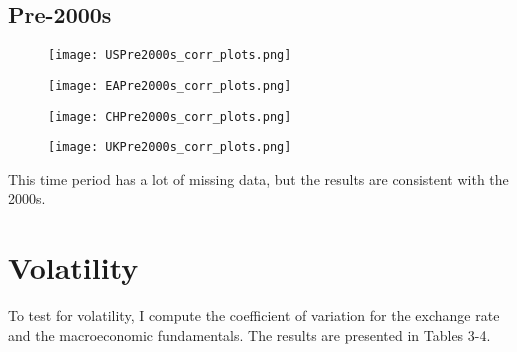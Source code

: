 \documentclass{article}
\begin{document}
\subsection{Pre-2000s}
\begin{figure}[H]
    \centering
    \texttt{[image: USPre2000s\_corr\_plots.png]}
\end{figure}
\begin{figure}[H]
    \centering
    \texttt{[image: EAPre2000s\_corr\_plots.png]}
\end{figure}
\begin{figure}[H]
    \centering
    \texttt{[image: CHPre2000s\_corr\_plots.png]}
\end{figure}
\begin{figure}[H]
    \centering
    \texttt{[image: UKPre2000s\_corr\_plots.png]}
\end{figure}

This time period has a lot of missing data, but the results are consistent with the 2000s.


\section{Volatility}
To test for volatility, I compute the coefficient of variation for the exchange rate and the macroeconomic fundamentals. The results are presented in Tables 3-4.
\end{document}
